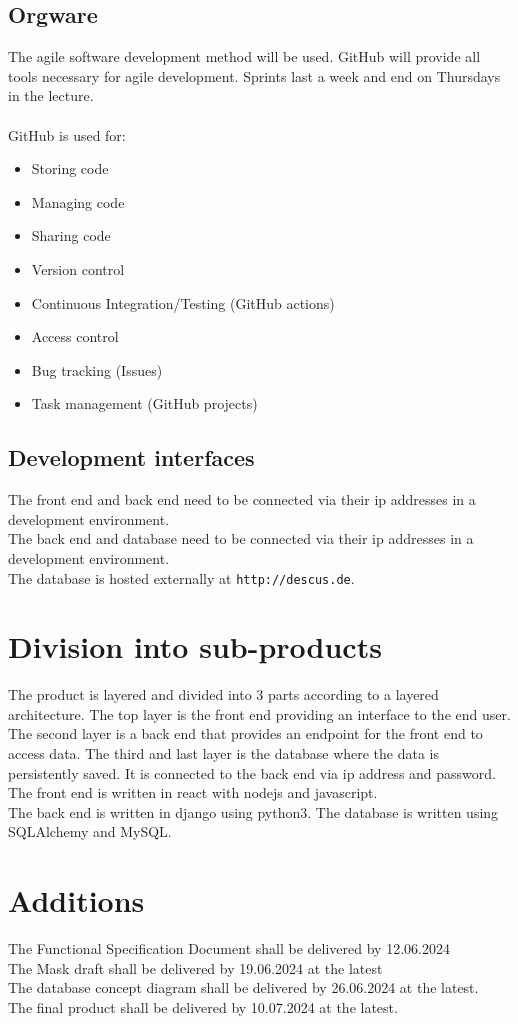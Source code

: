 \documentclass[]{article}
\begin{document}
	\subsection{Orgware}
		The agile software development method will be used. GitHub will provide all tools necessary for agile development. Sprints last a week and end on Thursdays in the lecture.\\
		\\
		GitHub is used for:
		\begin{itemize}
			\item Storing code
			\item Managing code
			\item Sharing code
			\item Version control
			\item Continuous Integration/Testing (GitHub actions)
			\item Access control
			\item Bug tracking (Issues)
			\item Task management (GitHub projects)
		\end{itemize}
	\subsection{Development interfaces}
		The front end and back end need to be connected via their ip addresses in a development environment.\\
		The back end and database need to be connected via their ip addresses in a development environment.\\
		The database is hosted externally at \texttt{http://descus.de}.
\section{Division into sub-products}
	The product is layered and divided into 3 parts according to a layered architecture. The top layer is the front end providing an interface to the end user. The second layer is a back end that provides an endpoint for the front end to access data. The third and last layer is the database where the data is persistently saved. It is connected to the back end via ip address and password.\\
	The front end is written in react with nodejs and javascript.\\
	The back end is written in django using python3.
	The database is written using SQLAlchemy and MySQL.
\section{Additions}
	The Functional Specification Document shall be delivered by 12.06.2024\\
	The Mask draft shall be delivered by 19.06.2024 at the latest\\
	The database concept diagram shall be delivered by 26.06.2024 at the latest.\\
	The final product shall be delivered by 10.07.2024 at the latest.
\end{document}
